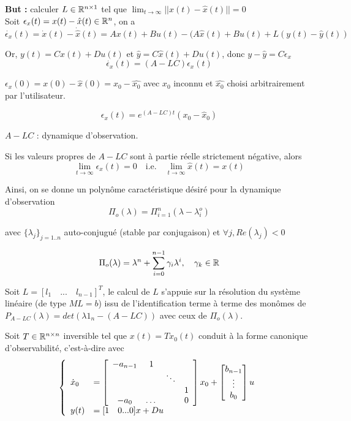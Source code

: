 \documentclass[main.tex]{subfiles}
\begin{document}
\textbf{\textbf{But :}} calculer $L\in\mathbb{R}^{n\times 1}$ tel que $\lim_{t\rightarrow\infty} ||x(t) - \hat{x}(t) || = 0$ \\

Soit $\epsilon_x(t) = x(t)-\hat{x}(t)\in\mathbb{R}^n$, on a
\[\dot{\epsilon_x}(t) = \dot{x}(t)-\dot{\hat{x}}(t) = Ax(t)+Bu(t)-(A\hat{x}(t)+Bu(t)+L(y(t)-\hat{y}(t))\]

Or, $y(t) = Cx(t) + Du(t)$ et $\hat{y}=C\hat{x}(t) +Du(t)$, donc $y-\hat{y} = C\epsilon_x$
\[\dot{\epsilon_x}(t) = (A-LC)\epsilon_x(t)\]

$\epsilon_x(0) = x(0) - \hat{x}(0) = x_0 - \hat{x_0}$ avec $x_0$ inconnu et $\hat{x_0}$ choisi arbitrairement par l'utilisateur.

\[\epsilon_x(t) = e^{(A-LC)t}(x_0-\hat{x}_0)\]

$A-LC$ : dynamique d'observation.

Si les valeurs propres de $A-LC$ sont à partie réelle strictement négative, alors \[\lim_{t\to\infty} \epsilon_x(t) = 0 \quad \text{i.e.} \quad \lim_{t\to\infty} \hat{x}(t) = x(t)\]

Ainsi, on se donne un polynôme caractéristique désiré pour la dynamique d'observation
\[ \Pi_o(\lambda) = \Pi_{i=1}^n (\lambda-\lambda_i^o) \]

avec $\{\lambda_j\}_{j=1..n}$ auto-conjugué (stable par conjugaison) et $\forall j, Re(\lambda_j)<0$

\[ \Pi_o(\lambda) = \lambda^n + \sum_{i=0}^{n-1} \gamma_i \lambda^i, \quad \gamma_k\in\mathbb{R} \]

Soit $L=[l_1 \quad ... \quad l_{n-1}]^T$, le calcul de $L$ s'appuie sur la résolution du système linéaire (de type $ML=b$) issu de l'identification terme à terme des monômes de $P_{A-LC}(\lambda) = det (\lambda 1_n - (A-LC))$ avec ceux de $\Pi_o(\lambda)$.

Soit $T\in\mathbb{R}^{n\times n}$ inversible tel que $x(t) = Tx_0(t)$ conduit à la forme canonique d'observabilité, c'est-à-dire avec
\[
\left\{
\begin{array}{ll}
\dot{x}_0 & = \left[ \begin{array}{cccc}
-a_{n-1} & 1 \\
& & \ddots \\
& & & 1 \\
-a_0 & \dots & & 0
\end{array}\right] x_0 + \begin{bmatrix} b_{n-1} \\ \vdots \\ b_0 \end{bmatrix}u \\
y(t) &= [1 \quad 0 ... 0]x+Du
\end{array}
\right.
\]
\end{document}
